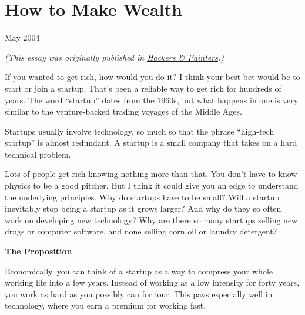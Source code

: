 \chapter{How to Make Wealth}

May 2004

\emph{(This essay was originally published in
\href{http://www.amazon.com/gp/product/0596006624/104-0572701-7443937}{Hackers
\& Painters}.)}

If you wanted to get rich, how would you do it? I think your best bet
would be to start or join a startup. That's been a reliable way to get
rich for hundreds of years. The word ``startup'' dates from the 1960s,
but what happens in one is very similar to the venture-backed trading
voyages of the Middle Ages.

Startups usually involve technology, so much so that the phrase
``high-tech startup'' is almost redundant. A startup is a small company
that takes on a hard technical problem.

Lots of people get rich knowing nothing more than that. You don't have
to know physics to be a good pitcher. But I think it could give you an
edge to understand the underlying principles. Why do startups have to be
small? Will a startup inevitably stop being a startup as it grows
larger? And why do they so often work on developing new technology? Why
are there so many startups selling new drugs or computer software, and
none selling corn oil or laundry detergent?

\textbf{The Proposition}

Economically, you can think of a startup as a way to compress your whole
working life into a few years. Instead of working at a low intensity for
forty years, you work as hard as you possibly can for four. This pays
especially well in technology, where you earn a premium for working
fast.

